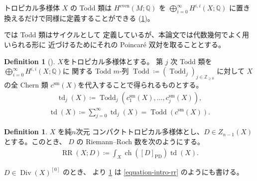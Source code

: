 \documentclass[a4paper,dvipdfmx,reqno,12pt]{amsart}
\theoremstyle{definition}
\newtheorem{definition}[theorem]{Definition}
\newcommand{\deq}{\coloneqq}
\newcommand{\opn}[1]{\operatorname{#1}}
\newcommand{\PD}[1]{[#1]_{\mathrm{PD}}}
\numberwithin{equation}{section}
\begin{document}
トロピカル多様体 $X$ の Todd 類は
$H^{\mathrm{even}}(M;\mathbb{Q})$ を
$\bigoplus_{i=0}^{\infty} H^{i,i}(X;\mathbb{Q})$
に置き換えるだけで同様に定義することができる
(\cref{definition-tropical-todd})。

\cite[Conjecture 6.13]{demedrano2023chern} では Todd 類はサイクルとして
定義しているが、本論文では代数幾何でよく用いられる形に
近づけるためにそれの Poincar\'e 双対を取ることとする。

\begin{definition}[{\cite[]{demedrano2023chern}}]
\label{definition-tropical-todd}
$X$をトロピカル多様体とする。
第 $j$ 次 Todd 類を
$\bigoplus_{i=0}^{\infty} H^{i,i}(X;\mathbb{Q})$に
関する Todd $m$-列 $\opn{Todd}\deq (\opn{Todd}_j)_{j\in \mathbb{Z}_{\geq 0}}$
に対して
$X$ の全 Chern 類
$c^{\mathrm{sm}}(X)$を代入することで得られるものとする。
\begin{align}
\opn{td}_j(X)\deq \opn{Todd}_j(c_{1}^{\mathrm{sm}}(X),
\ldots,c_{j}^{\mathrm{sm}}(X)),
\end{align}
\begin{align}
\opn{td}(X)\deq \sum_{j=0}^{\infty}\opn{td}_j(X)=
\opn{Todd}(c^{\mathrm{sm}}(X)).
\end{align}

\end{definition}



\begin{definition}
\label{definition-rr-number}
$X$ を純$n$次元
コンパクトトロピカル多様体とし、$D\in Z_{n-1}(X)$
とする。このとき、
$D$ の Riemann--Roch 数を次のようにする。
\begin{align}
\opn{RR}(X;D)\deq \int_X \opn{ch}(\PD{D})\opn{td}(X).
\end{align}
\end{definition}
$D\in \opn{Div}(X)^{[0]}$ のとき、
\cite[Proposition 5.12]{MR4637248} より
\cref{definition-rr-number} は
\cref{equation-intro-rr} のようにも書ける。
\end{document}
